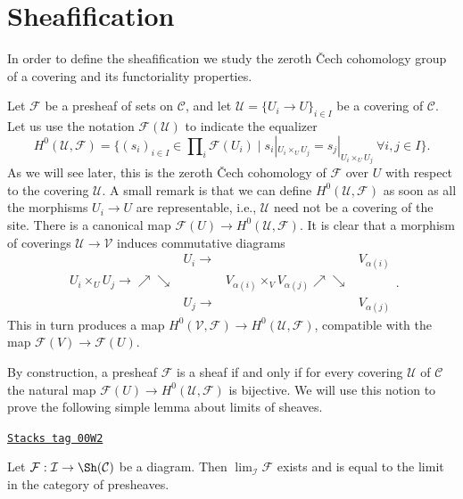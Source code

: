 \section{Sheafification}
\label{sites-section-sheafification}
In order to define the sheafification we study the zeroth
{\v C}ech cohomology group of a covering and its functoriality
properties.

\medskip\noindent
Let $\mathcal{F}$ be a presheaf of sets on $\mathcal{C}$, and let
$\mathcal{U} = \{U_i \to U\}_{i \in I}$ be a covering of $\mathcal{C}$.
Let us use the notation $\mathcal{F}(\mathcal{U})$ to indicate the equalizer
$$
H^0(\mathcal{U}, \mathcal{F})
=
\{
(s_i)_{i\in I} \in \prod\nolimits_i \mathcal{F}(U_i)
\mid
s_i|_{U_i \times_U U_j} = s_j|_{U_i \times_U U_j}
\ \forall i, j \in I
\}.
$$
As we will see later, this is the zeroth {\v C}ech cohomology
of $\mathcal{F}$ over $U$ with respect to the covering $\mathcal{U}$.
A small remark is that we can define $H^0(\mathcal{U}, \mathcal{F})$
as soon as all the morphisms $U_i \to U$ are representable, i.e.,
$\mathcal{U}$ need not be a covering of the site.
There is a canonical map $\mathcal{F}(U) \to H^0(\mathcal{U}, \mathcal{F})$.
It is clear that a morphism of coverings $\mathcal{U} \to \mathcal{V}$
induces commutative diagrams
$$
\begin{array}{cccc} & U_i \longrightarrow &  & V_{\alpha(i)} \\ U_i \times_U U_j \longrightarrow\nearrow\searrow &  & V_{\alpha(i)} \times_V V_{\alpha(j)} \nearrow\searrow &  \\  & U_j \longrightarrow &  & V_{\alpha(j)}\end{array}.
$$
This in turn produces a map $H^0(\mathcal{V}, \mathcal{F}) \to
H^0(\mathcal{U}, \mathcal{F})$, compatible with the map $\mathcal{F}(V)
\to \mathcal{F}(U)$.

\medskip\noindent
By construction, a presheaf $\mathcal{F}$ is a sheaf if and only if for
every covering $\mathcal{U}$ of $\mathcal{C}$ the natural map
$\mathcal{F}(U) \to H^0(\mathcal{U}, \mathcal{F})$ is bijective.
We will use this notion to prove the following
simple lemma about limits of sheaves.

\begin{lemma}
\label{sites-lemma-limit-sheaf}
\href{https://stacks.math.columbia.edu/tag/00W2}{\texttt{Stacks tag 00W2}}


Let $\mathcal{F} : \mathcal{I} \to \Sh(\mathcal{C})$
be a diagram. Then $\lim_\mathcal{I} \mathcal{F}$ exists
and is equal to the limit in the category of presheaves.
\end{lemma}

